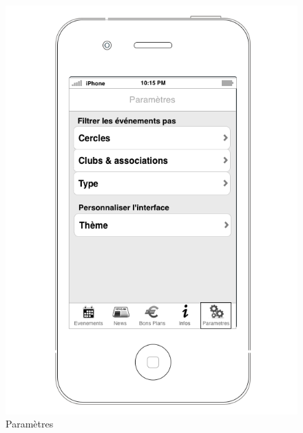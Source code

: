 \documentclass[a4paper, 11pt]{article}
\begin{document}
\begin{figure}[h!]
\begin{minipage}[c]{.33\linewidth}
\begin{center}
			\includegraphics[scale=0.29]{../../Sketch/iOS/parametres.png}
		\end{center}
	\caption{Paramètres}
	\end{minipage}
	\hfill
	\begin{minipage}[c]{.33\linewidth}
		\begin{center}

\end{center}
\end{minipage}
\end{figure}
\end{document}
